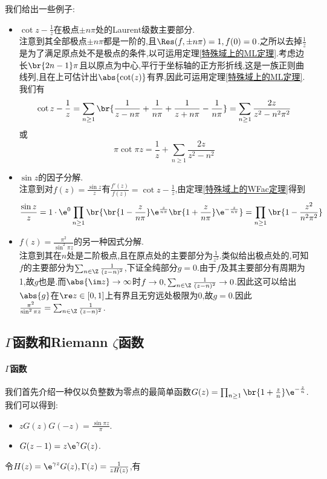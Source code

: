 \documentclass{article}
\begin{document}
我们给出一些例子:\begin{itemize}
    \item $\cot z-\frac{1}{z}$在极点$\pm n\pi$处的Laurent级数主要部分.\\
    注意到其全部极点$\pm n\pi$都是一阶的,且$\Res(f,\pm n\pi)=1,f(0)=0$.之所以去掉$\frac{1}{z}$是为了满足原点处不是极点的条件,以可运用定理\ref{特殊域上的ML定理}.考虑边长$\br{2n-1}\pi$且以原点为中心,平行于坐标轴的正方形折线,这是一族正则曲线列,且在上可估计出$\abs{\cot(z)}$有界,因此可运用定理\ref{特殊域上的ML定理}.我们有
    $$\cot z-\frac{1}{z}=\sum_{n\geq 1}\br{\frac{1}{z-n\pi}+\frac{1}{n\pi}+\frac{1}{z+n\pi}-\frac{1}{n\pi}}=\sum_{n\geq 1}\frac{2z}{z^2-n^2\pi^2}$$
    或$$\pi\cot \pi z=\frac{1}{z}+\sum_{n\geq 1}\frac{2z}{z^2-n^2}$$
    \item $\sin z$的因子分解.\\
    注意到对$f(z)=\frac{\sin z}{z}$有$\frac{f'(z)}{f(z)}=\cot z-\frac{1}{z}$,由定理\ref{特殊域上的WFac定理}得到
    $$\frac{\sin z}{z}=1\cdot \e^{0}\prod_{n\geq 1}\br{\br{1-\frac{z}{n\pi}}\e^{\frac{z}{n\pi}}\br{1+\frac{z}{n\pi}}\e^{-\frac{z}{n\pi}}}=\prod_{n\geq 1}\br{1-\frac{z^2}{n^2\pi^2}}$$
    \item $f(z)=\frac{\pi^2}{\sin^2 \pi z}$的另一种因式分解.\\
    注意到其在$n$处是二阶极点,且在原点处的主要部分为$\frac{1}{z^2}$.类似给出极点处的,可知$f$的主要部分为$\sum_{n\in\Z}\frac{1}{(z-n)^2}$,下证全纯部分$g=0$.由于$f$及其主要部分有周期为1,故$g$也是.而$\abs{\im z}\to\infty$时$f\to 0, \sum_{n\in\Z}\frac{1}{(z-n)^2}\to 0$.因此这可以给出$\abs{g}$在$\re z\in[0,1]$上有界且无穷远处极限为0,故$g=0$.因此$\frac{\pi^2}{\sin^2 \pi z}=\sum_{n\in\Z}\frac{1}{(z-n)^2}$.
\end{itemize}

\subsection{$\Gamma$函数和Riemann $\zeta$函数}
\paragraph{$\Gamma$函数}
我们首先介绍一种仅以负整数为零点的最简单函数$G(z)=\prod_{n\geq 1}\br{1+\frac{z}{n}}\e^{-\frac{z}{n}}$.我们可以得到:
\begin{itemize}
    \item $zG(z)G(-z)=\frac{\sin \pi z}{\pi}$.
    \item $G(z-1)=z\e^\gamma G(z)$.\\
\end{itemize}
令$H(z)=\e^{\gamma z}G(z),\Gamma(z)=\frac{1}{zH(z)}$,有
\end{document}
